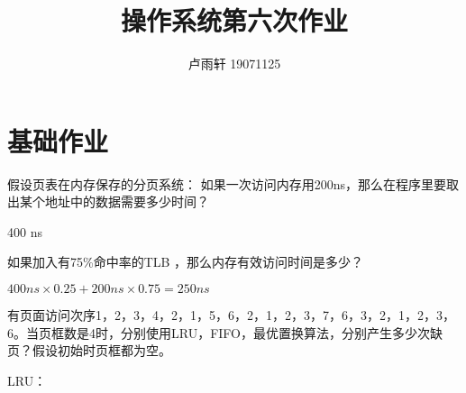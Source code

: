 \documentclass{ctexart}
\title{操作系统第六次作业}
\author{卢雨轩 19071125}
\begin{document}
\maketitle

\section*{基础作业}
\begin{outline}[enumerate]
\1 假设页表在内存保存的分页系统：
\2 如果一次访问内存用200ns，那么在程序里要取出某个地址中的数据需要多少时间？

    400 ns

\2 如果加入有75\%命中率的TLB ，那么内存有效访问时间是多少？

    $400 ns \times 0.25 + 200ns \times 0.75 = 250ns$

\1 有页面访问次序1，2，3，4，2，1，5，6，2，1，2，3，7，6，3，2，1，2，3，6。当页框数是4时，分别使用LRU，FIFO，最优置换算法，分别产生多少次缺页？假设初始时页框都为空。

    \2 LRU：


\end{outline}
\end{document}
